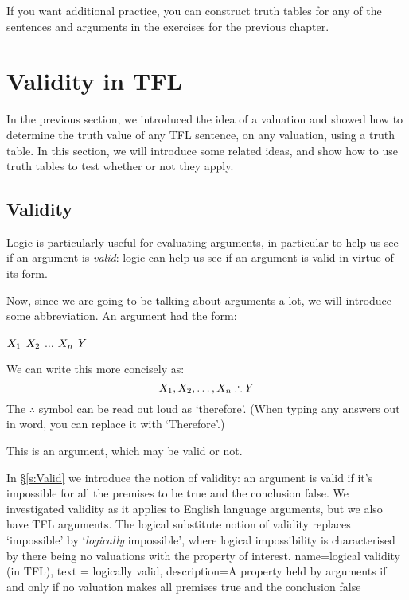 If you want additional practice, you can construct truth tables for any of the sentences and arguments in the exercises for the previous chapter.


\chapter{Validity in TFL}
\label{s:ValidityTFL}

In the previous section, we introduced the idea of a valuation and showed how to determine the truth value of any TFL sentence, on any valuation, using a truth table. In this section, we will introduce some related ideas, and show how to use truth tables to test whether or not they apply.

\section{Validity}
Logic is particularly useful for evaluating arguments, in particular to help us see if an argument is \emph{valid}: logic can help us see if an argument is valid in virtue of its form. 

Now, since we are going to be talking about arguments a lot, we will introduce some abbreviation. An argument had the form:
\begin{earg}
\prem $X_1$
\prem $X_2$
\prem $\ldots$
\prem $X_n$
\conc $Y$
\end{earg}
We can write this more concisely as: $$\metaX_1, \metaX_2, \ldots, \metaX_n\therefore \metaY$$ The $\therefore$ symbol can be read out loud as `therefore'. (When typing any answers out in word, you can replace it with `Therefore'.)

This is an argument, which may be valid or not. 

In \S\ref{s:Valid} we introduce the notion of validity: an argument is valid if it's impossible for all the premises to be true and the conclusion false. We investigated validity as it applies to English language arguments, but we also have TFL arguments. The logical substitute notion of validity replaces `impossible' by `\emph{logically} impossible', where logical impossibility is characterised by there being no valuations with the property of interest.
{
	name=logical validity (in TFL),
	text = logically valid,
	description={A property held by arguments if and only if no \gls{valuation} makes all premises true and the conclusion false}
}



